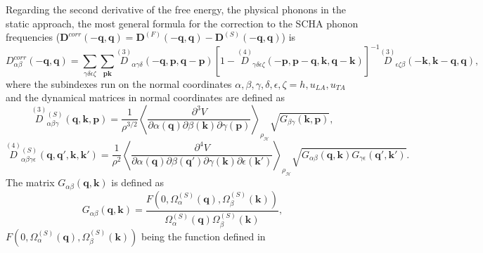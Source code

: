 Regarding the second derivative of the free energy, the physical phonons in the static approach, the most general
formula for the correction to the SCHA phonon frequencies ($\boldsymbol{D}^{corr}(-\boldsymbol{q},\boldsymbol{q})=\boldsymbol{D}^{(F)}(-\boldsymbol{q},\boldsymbol{q})-\boldsymbol{D}^{(S)}(-\boldsymbol{q},\boldsymbol{q})$) is
\begin{equation}
 \label{correction}
 D_{\alpha\beta}^{corr}(-\boldsymbol{q},\boldsymbol{q})=\sum_{\gamma\delta\epsilon\zeta}\sum_{\boldsymbol{p}\boldsymbol{k}}\overset{(3)}{D}{}_{\alpha\gamma\delta}(-\boldsymbol{q},\boldsymbol{p},
 \boldsymbol{q}-\boldsymbol{p})[1-\overset{(4)}{D}{}_{\gamma\delta\epsilon\zeta}(-\boldsymbol{p},\boldsymbol{p}-\boldsymbol{q},\boldsymbol{k},\boldsymbol{q}-\boldsymbol{k})]^{-1}\overset{(3)}{D}{}_{
 \epsilon\zeta\beta}(-\boldsymbol{k},\boldsymbol{k}-\boldsymbol{q},\boldsymbol{q}),
\end{equation}
where the subindexes run on the normal coordinates $\alpha,\beta,\gamma,\delta,\epsilon,\zeta=h,u_{LA},u_{TA}$ and 
the dynamical matrices in normal coordinates are defined as
\begin{equation}
 \label{third-order}
\overset{(3)}{D}{}^{(S)}_{\alpha\beta\gamma}(\boldsymbol{q},\boldsymbol{k},\boldsymbol{p})=\frac{1}{\rho^{3/2}}\left\langle\frac{\partial^{3}V}{\partial\alpha(\boldsymbol{q})\partial\beta(\boldsymbol{k})\partial\gamma(\boldsymbol{
p})}\right\rangle_{\rho_{\mathcal{H}}}\sqrt{G_{\beta\gamma}(\boldsymbol{k},\boldsymbol{p})},
\end{equation}
\begin{equation}
 \label{fourth-order}
\overset{(4)}{D}{}^{(S)}_{\alpha\beta\gamma\epsilon}(\boldsymbol{q},\boldsymbol{q}',\boldsymbol{k},\boldsymbol{k}')=\frac{1}{\rho^{2}}\left\langle\frac{\partial^{4}V}{\partial\alpha(\boldsymbol{q})\partial\beta(\boldsymbol{
q}')\partial\gamma(\boldsymbol{k})\partial\epsilon(\boldsymbol{k}')}\right\rangle_{\rho_{\mathcal{H}}}\sqrt{G_{\alpha\beta}(\boldsymbol{q},\boldsymbol{k})G_{\gamma\epsilon}(\boldsymbol{q}',\boldsymbol{k}')}.
\end{equation}
The matrix $G_{\alpha\beta}(\boldsymbol{q},\boldsymbol{k})$ is defined as
\begin{equation}
	G_{\alpha\beta}(\boldsymbol{q},\boldsymbol{k})=\frac{F(0,\Omega_{\alpha}^{(S)}(\boldsymbol{q}),\Omega_{\beta}^{(S)}(\boldsymbol{k}))}{\Omega_{\alpha}^{(S)}(\boldsymbol{q})\Omega_{\beta}^{(S)}(\boldsymbol{k})},
\end{equation}
$F(0,\Omega_{\alpha}^{(S)}(\boldsymbol{q}),\Omega_{\beta}^{(S)}(\boldsymbol{k}))$ being the function defined in
